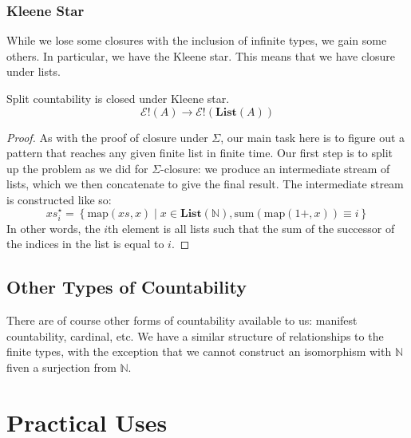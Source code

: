 \subsubsection{Kleene Star}
While we lose some closures with the inclusion of infinite types, we gain some
others.
In particular, we have the Kleene star.
This means that we have closure under lists.
\begin{rm-theorem}
  Split countability is closed under Kleene star.
  \begin{equation}
    \mathcal{E}!(A) \rightarrow \mathcal{E}!(\mathbf{List}(A))
  \end{equation}
\end{rm-theorem}
\begin{proof}
  As with the proof of closure under \(\Sigma\), our main task here is to figure
  out a pattern that reaches any given finite list in finite time.
  Our first step is to split up the problem as we did for \(\Sigma\)-closure: we
  produce an intermediate stream of lists, which we then concatenate to give the
  final result.
  The intermediate stream is constructed like so:
  \begin{equation}
    \mathit{xs}^\star_i = \left\{ \text{map}(\mathit{xs} , x) \mid \mathit{x} \in \mathbf{List}(\mathbb{N}) , \text{sum}(\text{map}(1+, x)) \equiv i \right\}
  \end{equation}
  In other words, the \(i\)th element is all lists such that the sum of the
  successor of the indices in the list is equal to \(i\).
\end{proof}
\subsection{Other Types of Countability}
There are of course other forms of countability available to us: manifest
countability, cardinal, etc.
We have a similar structure of relationships to the finite types, with the
exception that we cannot construct an isomorphism with \(\mathbb{N}\) fiven a
surjection from \(\mathbb{N}\).
\section{Practical Uses} \label{practical}
